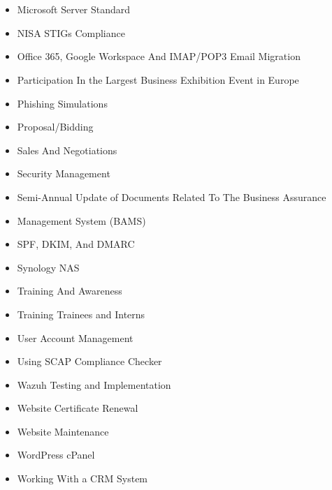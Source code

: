 \documentclass[letterpaper, 10pt]{article}
\begin{document}
	\begin{minipage}[t]{0.5\textwidth}
		\section*{}
		\begin{itemize}
			\item Microsoft Server Standard
			
			\item NISA STIGs Compliance
			
			\item Office 365, Google Workspace And IMAP/POP3 Email Migration
			
			\item Participation In the Largest Business Exhibition Event in Europe
			
			\item Phishing Simulations
			
			\item Proposal/Bidding
			
			\item Sales And Negotiations
			
			\item Security Management
			
			\item Semi-Annual Update of Documents Related To The Business Assurance
			
			\item Management System (BAMS)
			
			\item SPF, DKIM, And DMARC
			
			\item Synology NAS
			
			\item Training And Awareness
			
			\item Training Trainees and Interns
			
			\item User Account Management
			
			\item Using SCAP Compliance Checker
			
			\item Wazuh Testing and Implementation
			
			\item Website Certificate Renewal
			
			\item Website Maintenance
			
			\item WordPress cPanel
			
			\item Working With a CRM System
		\end{itemize}
	\end{minipage}
	
\end{document}
